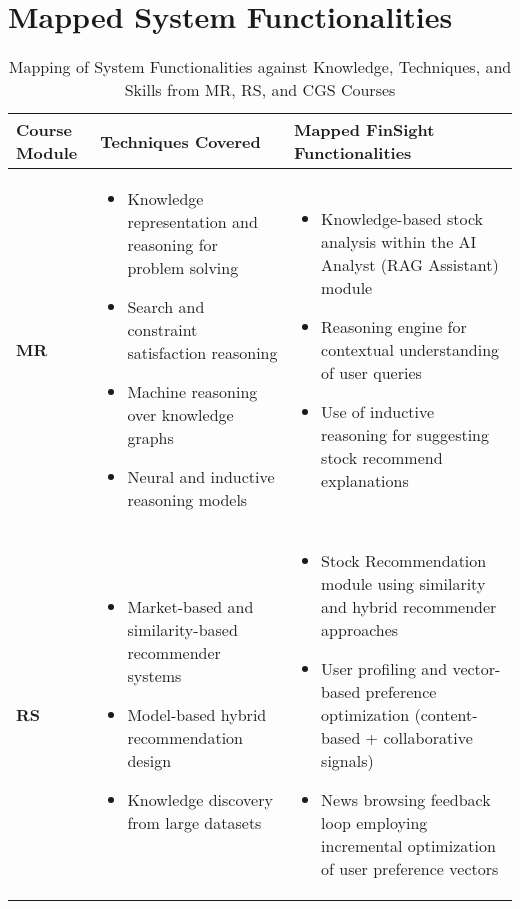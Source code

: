 \chapter{Mapped System Functionalities}
\thispagestyle{plain}  %
\vspace*{-1cm}         %
\noindent 

\begin{table}[H]
\centering
\caption{Mapping of System Functionalities against Knowledge, Techniques, and Skills from MR, RS, and CGS Courses}
\renewcommand{\arraystretch}{1.3}
\begin{tabular}{|p{2.8cm}|p{5cm}|p{7cm}|}
\hline
\textbf{Course Module} & \textbf{Techniques Covered} & \textbf{Mapped FinSight Functionalities} \\
\hline
\textbf{MR} &
\begin{itemize}
  \item Knowledge representation and reasoning for problem solving
  \item Search and constraint satisfaction reasoning
  \item Machine reasoning over knowledge graphs
  \item Neural and inductive reasoning models
\end{itemize}
&
\begin{itemize}
  \item Knowledge-based stock analysis within the AI Analyst (RAG Assistant) module
  \item Reasoning engine for contextual understanding of user queries
  \item Use of inductive reasoning for suggesting stock recommend explanations
\end{itemize}
\\
\hline
\textbf{RS} &
\begin{itemize}
  \item Market-based and similarity-based recommender systems
  \item Model-based hybrid recommendation design
  \item Knowledge discovery from large datasets
\end{itemize}
&
\begin{itemize}
  \item Stock Recommendation module using similarity and hybrid recommender approaches
  \item User profiling and vector-based preference optimization (content-based + collaborative signals)
  \item News browsing feedback loop employing incremental optimization of user preference vectors

\end{itemize}
\end{tabular}
\end{table}
